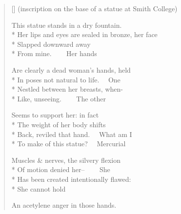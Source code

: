 \label{ch:in_memory_of_a_beautiful}
\settowidth{\versewidth}{(inscription on the base of a statue at Smith College)}
\begin{verse}[\versewidth]
(inscription on the base of a statue at Smith College)

This statue stands in a dry fountain.\\*
Her lips and eyes are sealed in bronze, her face\\*
Slapped downward away\\*
From mine.     Her hands

Are clearly a dead woman's hands, held\\*
In poses not natural to life.   One\\*
Nestled between her breasts, when-\\*
Like, unseeing.     The other

Seems to support her: in fact\\*
The weight of her body shifts\\*
Back, reviled that hand.   What am I\\*
To make of this statue?   Mercurial

Muscles \& nerves, the silvery flexion\\*
Of motion denied her--     She\\*
Has been created intentionally flawed:\\*
She cannot hold

An acetylene anger in those hands.
\end{verse}
